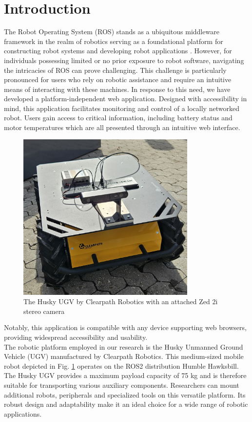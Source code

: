 \documentclass[conference]{IEEEtran}
\begin{document}
\section{Introduction}
The Robot Operating System (ROS) stands as a ubiquitous middleware framework in the realm of robotics serving as a foundational platform for constructing robot systems and developing robot applications \cite{rosOrg}. 
However, for individuals possessing limited or no prior exposure to robot software, navigating the intricacies of ROS can prove challenging. 
This challenge is particularly pronounced for users who rely on robotic assistance and require an intuitive means of interacting with these machines.
In response to this need, we have developed a platform-independent web application. 
Designed with accessibility in mind, this application facilitates monitoring and control of a locally networked robot. Users gain access to critical information, including battery status and motor temperatures which are all presented through an intuitive web interface. 
\begin{figure}[htp]
    \centerline{\includegraphics[width=8.9cm]{Pictures/huskyzed2.jpg}}
    \caption{The Husky UGV by Clearpath Robotics with an attached Zed 2i stereo camera}
    \label{fig:huskyClearpath}
\end{figure}
Notably, this application is compatible with any device supporting web browsers, providing widespread accessibility and usability.
\\The robotic platform employed in our research is the Husky Unmanned Ground Vehicle (UGV) manufactured by Clearpath Robotics. This medium-sized mobile robot depicted in Fig. \ref{fig:huskyClearpath} operates on the ROS2 distribution Humble Hawksbill.
The Husky UGV provides a maximum payload capacity of 75 kg and is therefore suitable for transporting various auxiliary components. Researchers can mount additional robots, peripherals and specialized tools on this versatile platform. Its robust design and adaptability make it an ideal choice for a wide range of robotic applications. \cite{huskyClearpath} 
\end{document}
